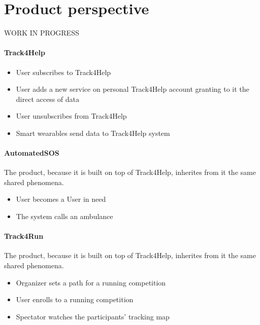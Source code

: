 \documentclass[../../rasd.tex]{subfiles}
\begin{document}
	
	\section{Product perspective}
		WORK IN PROGRESS\\
		\paragraph{Track4Help}
		\begin{itemize}
			\item User subscribes to Track4Help
			\item User adds a new service on personal Track4Help account granting to it the direct access of data
			\item User unsubscribes from Track4Help
			\item Smart wearables send data to Track4Help system
		\end{itemize}
		\paragraph{AutomatedSOS}
		The product, because it is built on top of Track4Help, inherites from it the same shared phenomena.
		\begin{itemize}
			\item User becomes a User in need
			\item The system calls an ambulance
		\end{itemize}
		\paragraph{Track4Run}
		The product, because it is built on top of Track4Help, inherites from it the same shared phenomena.
		\begin{itemize}
			\item Organizer sets a path for a running competition
			\item User enrolls to a running competition
			\item Spectator watches the participants' tracking map			
		\end{itemize}
\end{document}

